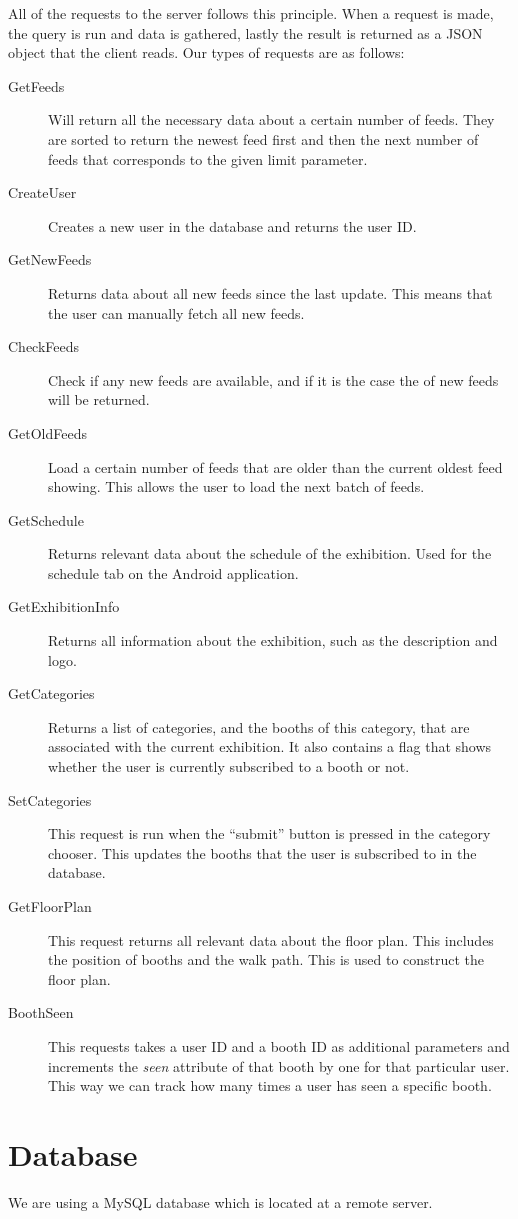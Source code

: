 All of the requests to the server follows this principle. When a request is made, the query is run and data is gathered, lastly the result is returned as a JSON object that the client reads. Our types of requests are as follows:
\begin{description}
\item[GetFeeds] Will return all the necessary data about a certain number of feeds. They are sorted to return the newest feed first and then the next number of feeds that corresponds to the given limit parameter.
\item[CreateUser] Creates a new user in the database and returns the user ID.
\item[GetNewFeeds] Returns data about all new feeds since the last update. This means that the user can manually fetch all new feeds.
\item[CheckFeeds] Check if any new feeds are available, and if it is the case the of new feeds will be returned.
\item[GetOldFeeds] Load a certain number of feeds that are older than the current oldest feed showing. This allows the user to load the next batch of feeds.
\item[GetSchedule] Returns relevant data about the schedule of the exhibition. Used for the schedule tab on the Android application.
\item[GetExhibitionInfo] Returns all information about the exhibition, such as the description and logo.
\item[GetCategories] Returns a list of categories, and the booths of this category, that are associated with the current exhibition. It also contains a flag that shows whether the user is currently subscribed to a booth or not.
\item[SetCategories] This request is run when the ``submit'' button is pressed in the category chooser. This updates the booths that the user is subscribed to in the database.
\item[GetFloorPlan] This request returns all relevant data about the floor plan. This includes the position of booths and the walk path. This is used to construct the floor plan.
\item[BoothSeen] This requests takes a user ID and a booth ID as additional parameters and increments the \textit{seen} attribute of that booth by one for that particular user. This way we can track how many times a user has seen a specific booth.
\end{description}

\section{Database}
We are using a MySQL database which is located at a remote server.

